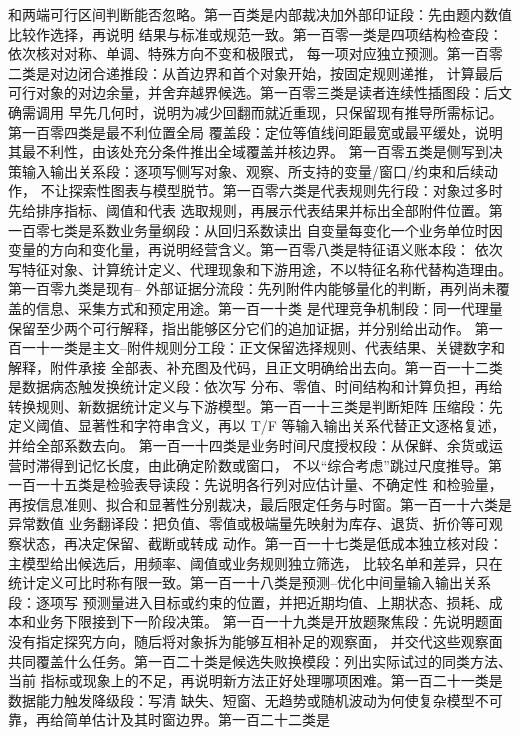 和两端可行区间判断能否忽略。第一百类是内部裁决加外部印证段：先由题内数值比较作选择，再说明
结果与标准或规范一致。第一百零一类是四项结构检查段：依次核对对称、单调、特殊方向不变和极限式，
每一项对应独立预测。第一百零二类是对边闭合递推段：从首边界和首个对象开始，按固定规则递推，
计算最后可行对象的对边余量，并舍弃越界候选。第一百零三类是读者连续性插图段：后文确需调用
早先几何时，说明为减少回翻而就近重现，只保留现有推导所需标记。第一百零四类是最不利位置全局
覆盖段：定位等值线间距最宽或最平缓处，说明其最不利性，由该处充分条件推出全域覆盖并核边界。
第一百零五类是侧写到决策输入输出关系段：逐项写侧写对象、观察、所支持的变量/窗口/约束和后续动作，
不让探索性图表与模型脱节。第一百零六类是代表规则先行段：对象过多时先给排序指标、阈值和代表
选取规则，再展示代表结果并标出全部附件位置。第一百零七类是系数业务量纲段：从回归系数读出
自变量每变化一个业务单位时因变量的方向和变化量，再说明经营含义。第一百零八类是特征语义账本段：
依次写特征对象、计算统计定义、代理现象和下游用途，不以特征名称代替构造理由。第一百零九类是现有--
外部证据分流段：先列附件内能够量化的判断，再列尚未覆盖的信息、采集方式和预定用途。第一百一十类
是代理竞争机制段：同一代理量保留至少两个可行解释，指出能够区分它们的追加证据，并分别给出动作。
第一百一十一类是主文--附件规则分工段：正文保留选择规则、代表结果、关键数字和解释，附件承接
全部表、补充图及代码，且正文明确给出去向。第一百一十二类是数据病态触发换统计定义段：依次写
分布、零值、时间结构和计算负担，再给转换规则、新数据统计定义与下游模型。第一百一十三类是判断矩阵
压缩段：先定义阈值、显著性和字符串含义，再以 T/F 等输入输出关系代替正文逐格复述，并给全部系数去向。
第一百一十四类是业务时间尺度授权段：从保鲜、余货或运营时滞得到记忆长度，由此确定阶数或窗口，
不以“综合考虑”跳过尺度推导。第一百一十五类是检验表导读段：先说明各行列对应估计量、不确定性
和检验量，再按信息准则、拟合和显著性分别裁决，最后限定任务与时窗。第一百一十六类是异常数值
业务翻译段：把负值、零值或极端量先映射为库存、退货、折价等可观察状态，再决定保留、截断或转成
动作。第一百一十七类是低成本独立核对段：主模型给出候选后，用频率、阈值或业务规则独立筛选，
比较名单和差异，只在统计定义可比时称有限一致。第一百一十八类是预测--优化中间量输入输出关系段：逐项写
预测量进入目标或约束的位置，并把近期均值、上期状态、损耗、成本和业务下限接到下一阶段决策。
第一百一十九类是开放题聚焦段：先说明题面没有指定探究方向，随后将对象拆为能够互相补足的观察面，
并交代这些观察面共同覆盖什么任务。第一百二十类是候选失败换模段：列出实际试过的同类方法、当前
指标或现象上的不足，再说明新方法正好处理哪项困难。第一百二十一类是数据能力触发降级段：写清
缺失、短窗、无趋势或随机波动为何使复杂模型不可靠，再给简单估计及其时窗边界。第一百二十二类是
